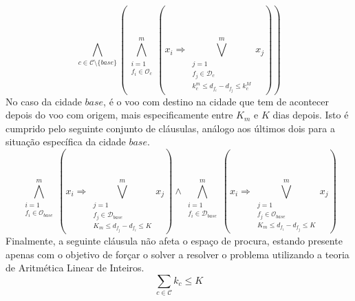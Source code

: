 \documentclass[12pt,a4paper]{article}
\begin{document}
        \begin{equation}
            \bigwedge_{c \in \mathcal{C} \setminus \{base\}}
            \left(
            \bigwedge_{\substack{i = 1 \\
                                 f_i \in \mathcal{O}_c}}
                     ^{m}
            \left(
            x_i \Rightarrow
            \bigvee_{\substack{j = 1 \\
                               f_j \in \mathcal{D}_c \\
                               k_c^m \leq d_{f_i} - d_{f_j} \leq k_c^M}}
                ^{m}
                {x_j}
            \right)
            \right)
            \label{k_nights_arrivals}
        \end{equation}
        No caso da cidade $base$, é o voo com destino na cidade que tem de acontecer depois do voo com origem, mais especificamente entre $K_m$ e $K$ dias depois. Isto é cumprido pelo seguinte conjunto de cláusulas, análogo aos últimos dois para a situação específica da cidade $base$.
        \begin{equation}
            \bigwedge_{\substack{i = 1 \\
                                 f_i \in \mathcal{O}_{base}}}
                     ^{m}
            \left(
            x_i \Rightarrow
            \bigvee_{\substack{j = 1 \\
                               f_j \in \mathcal{D}_{base} \\
                               K_m \leq d_{f_j} - d_{f_i} \leq K}}
                ^{m}
                {x_j}
            \right)
            \land
            \bigwedge_{\substack{i = 1 \\
                                 f_i \in \mathcal{D}_{base}}}
                     ^{m}
            \left(
            x_i \Rightarrow
            \bigvee_{\substack{j = 1 \\
                               f_j \in \mathcal{O}_{base} \\
                               K_m \leq d_{f_i} - d_{f_j} \leq K}}
                ^{m}
                {x_j}
            \right)
            \label{K_nights_base}
        \end{equation}
        Finalmente, a seguinte cláusula não afeta o espaço de procura, estando presente apenas com o objetivo de forçar o solver a resolver o problema utilizando a teoria de Aritmética Linear de Inteiros.
        \begin{equation}
            \sum_{c \in \mathcal{C}}{k_c} \leq K
            \label{kc_sum}
        \end{equation}     
    
\end{document}
